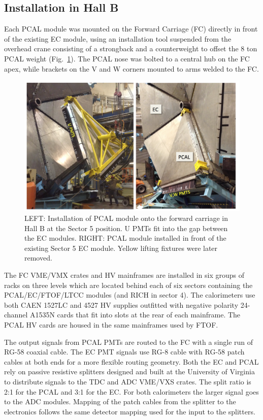 \subsection{Installation in Hall B}
Each PCAL module was mounted on the Forward Carriage (FC) directly in front of the existing EC module, using an installation tool suspended from the overhead crane consisting of a strongback and a counterweight to offset the 8 ton PCAL weight (Fig.~\ref{fig:S5_1}).  The PCAL nose was bolted to a central hub on the FC apex, while brackets on the V and W corners mounted to arms welded to the FC.   

\begin{figure}[hbt]
\centering
\includegraphics[width=0.95\columnwidth,keepaspectratio]{img/S5_1.png}
\caption{LEFT: Installation of PCAL module onto the forward carriage in Hall B at the Sector 5 position. U PMTs fit into the gap between the EC modules. RIGHT: PCAL module installed in front of the existing Sector 5 EC module. Yellow lifting fixtures were later removed. }
\label{fig:S5_1}
\end{figure}

The FC VME/VMX crates and HV mainframes are installed in six groups of racks on three levels which are located behind each of six sectors containing the PCAL/EC/FTOF/LTCC modules (and RICH in sector 4). The calorimeters use both CAEN 1527LC and 4527 HV supplies
outfitted with negative polarity 24-channel A1535N cards that fit into slots at the rear of each mainframe. The PCAL HV cards are housed in the same mainframes used by FTOF.  

The output signals from PCAL PMTs are routed to the FC with a single run of RG-58 coaxial cable. The EC PMT signals use RG-8 cable with RG-58 patch cables at both ends for a more flexible routing geometry.  Both the EC and PCAL rely on passive resistive splitters designed and built at the University of Virginia to distribute signals to the TDC and ADC VME/VXS crates.  The split ratio is 2:1 for the PCAL and 3:1 for the EC.  For both calorimeters the larger signal goes to the ADC modules.  Mapping of the patch cables from the splitter to the electronics follows the same detector mapping used for the input to the splitters.

